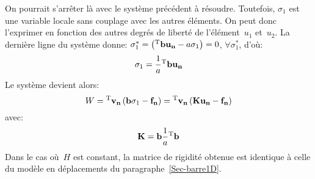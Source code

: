 \medskipvm
On pourrait s'arrêter là avec le système précédent à résoudre. Toutefois, $\sigma_1$ est une variable locale sans couplage avec les autres éléments. On peut donc l'exprimer en fonction des autres degrés de liberté de l'élément~$u_1$ et~$u_2$. La dernière ligne du système donne:
$\sigma_1^*=\left(\LL{b}\VV{u_n}-a\sigma_1\right)=0$, $\forall \sigma_1^*$,
d'où:
\begin{equation} \sigma_1 = \frac1a \LL{b}\VV{u_n} \end{equation}
\medskipvm
Le système devient alors:
\begin{equation} W=\LL{v_n}\left( \VV{b}\sigma_1 -\VV{f_n}\right) =
\LL{v_n} \left( \MM{K}\VV{u_n}-\VV{f_n}\right) \end{equation}
avec:
\begin{equation} \MM{K}=\VV{b}\frac1a\LL{b} \end{equation}
Dans le cas où~$H$ est constant, la matrice de rigidité obtenue est identique à celle du modèle en déplacements du paragraphe~\ref{Sec-barre1D}.
